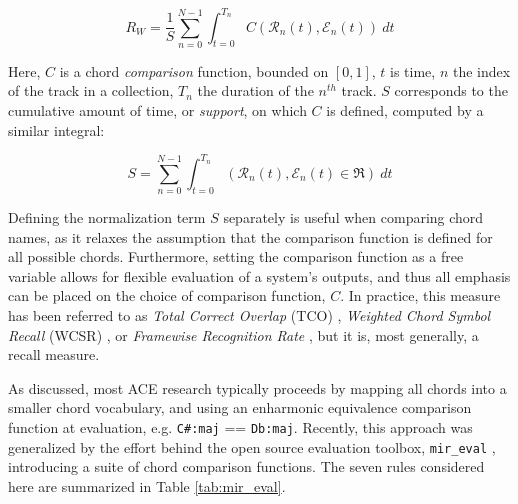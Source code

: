 \begin{equation}
\label{eq:recall_micro}
R_{W} = \frac{1}{S}\sum_{n=0}^{N-1}\int_{t=0}^{T_n}C(\mathcal{R}_n(t), \mathcal{E}_n(t))~dt
\end{equation}

\noindent Here, $C$ is a chord \emph{comparison} function, bounded on $[0, 1]$, $t$ is time, $n$ the index of the track in a collection, $T_n$ the duration of the $n^{th}$ track. $S$ corresponds to the cumulative amount of time, or \emph{support}, on which $C$ is defined, computed by a similar integral:

\begin{equation}
S = \sum_{n=0}^{N-1}\int_{t=0}^{T_n}(\mathcal{R}_n(t), \mathcal{E}_n(t) \in \Re)~dt
\end{equation}

Defining the normalization term $S$ separately is useful when comparing chord names, as it relaxes the assumption that the comparison function is defined for all possible chords.
Furthermore, setting the comparison function as a free variable allows for flexible evaluation of a system's outputs, and thus all emphasis can be placed on the choice of comparison function, $C$.
In practice, this measure has been referred to as \emph{Total Correct Overlap} (TCO) \cite{Mauch, Harte, McVicar}, \emph{Weighted Chord Symbol Recall} (WCSR) \cite{MIReX}, or \emph{Framewise Recognition Rate} \cite{Cho2014}, but it is, most generally, a recall measure.

As discussed, most ACE research typically proceeds by mapping all chords into a smaller chord vocabulary, and using an enharmonic equivalence comparison function at evaluation, e.g. \texttt{C\#:maj} == \texttt{Db:maj}.
Recently, this approach was generalized by the effort behind the open source evaluation toolbox, \texttt{mir\_eval} \cite{Raffel2014}, introducing a suite of chord comparison functions.
The seven rules considered here are summarized in Table \ref{tab:mir_eval}.

